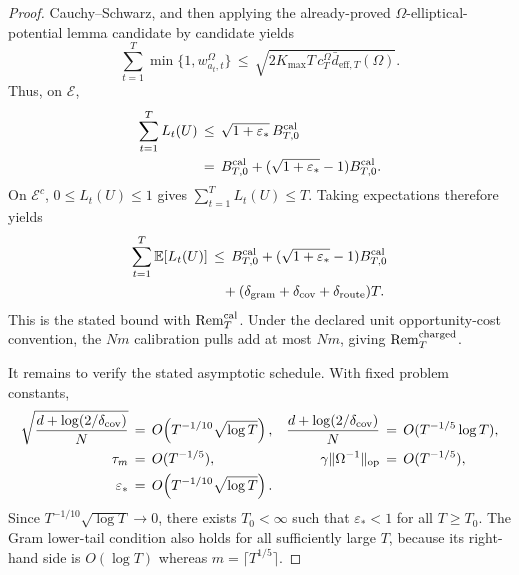 \documentclass{article} %
\begin{document}
\begin{proof}
Cauchy--Schwarz, and then applying the already-proved
\(\Omega\)-elliptical-potential lemma candidate by candidate yields
\begin{equation}
\sum_{t=1}^T\min\{1,w_{a_t,t}^{\Omega}\}
\,\leq\,
\sqrt{
2K_{\max}T\,c_T^\Omega
\bar d_{\mathrm{eff},T}(\Omega)
}.
\end{equation}
Thus, on \(\mathcal E\),
\begin{equation}
\begin{aligned}
\sum_{t=1}^T L_t(U)
&\,\leq\,
\sqrt{1+\varepsilon_*}\,B_{T,0}^{\rm cal}
\\
&\,=\,
B_{T,0}^{\rm cal}
+
(\sqrt{1+\varepsilon_*}-1)B_{T,0}^{\rm cal}.
\end{aligned}
\end{equation}
On \(\mathcal E^c\), \(0\leq L_t(U)\leq1\) gives
\(\sum_{t=1}^T L_t(U)\leq T\). Taking expectations therefore yields
\begin{equation}
\begin{aligned}
\sum_{t=1}^T\mathbb{E}[L_t(U)]
&\,\leq\,
B_{T,0}^{\rm cal}
+
(\sqrt{1+\varepsilon_*}-1)B_{T,0}^{\rm cal}
\\
&\quad
+
(\delta_{\rm gram}+\delta_{\rm cov}+\delta_{\rm route})T.
\end{aligned}
\end{equation}
This is the stated bound with \(\operatorname{Rem}_T^{\rm cal}\). Under the
declared unit opportunity-cost convention, the \(Nm\) calibration pulls add at
most \(Nm\), giving \(\operatorname{Rem}_T^{\rm charged}\).

It remains to verify the stated asymptotic schedule. With fixed problem
constants,
\begin{equation}
\begin{aligned}
\sqrt{\frac{d+\log(2/\delta_{\rm cov})}{N}}
&\,=\,
O\!\left(T^{-1/10}\sqrt{\log T}\right),
&
\frac{d+\log(2/\delta_{\rm cov})}{N}
&\,=\,
O(T^{-1/5}\log T),
\\
\tau_m
&\,=\,
O(T^{-1/5}),
&
\gamma\|\Omega^{-1}\|_{\mathrm{op}}
&\,=\,
O(T^{-1/5}),
\\
\varepsilon_*
&\,=\,
O\!\left(T^{-1/10}\sqrt{\log T}\right).
\end{aligned}
\end{equation}
Since \(T^{-1/10}\sqrt{\log T}\to0\), there exists \(T_0<\infty\) such that
\(\varepsilon_*<1\) for all \(T\ge T_0\).  The Gram lower-tail condition also
holds for all sufficiently large \(T\), because its right-hand side is
\(O(\log T)\) whereas \(m=\lceil T^{1/5}\rceil\).


\end{proof}
\end{document}
